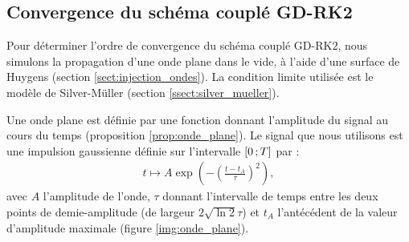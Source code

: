 \subsection{Convergence du schéma couplé GD-RK2}
\label{ssect:cv_gd_rk2}


Pour déterminer l'ordre de convergence du schéma couplé GD-RK$2$, nous simulons la
propagation d'une onde plane dans le vide, à l'aide d'une surface de Huygens (section
\ref{sect:injection_ondes}).
La condition limite utilisée est le modèle de Silver-Müller
(section \ref{ssect:silver_mueller}).

Une onde plane est définie par une fonction donnant l'amplitude
du signal au cours du temps (proposition \ref{prop:onde_plane}).
Le signal que nous utilisons est une impulsion gaussienne définie sur
l'intervalle $\lbrack0\,;T\rbrack$ par :
\begin{align} \label{eq:onde_plane}
	t \mapsto A \exp \left( -\left( \frac{t - t_A}{\tau} \right)^2 \right) ,
\end{align}
avec $A$ l'amplitude de l'onde, 
$\tau$ donnant l'intervalle de temps entre les deux points de demie-amplitude
(de largeur $2 \sqrt{\ln 2} \tau$)
et $t_A$ l'antécédent de la valeur d'amplitude maximale
(figure \ref{img:onde_plane}).


